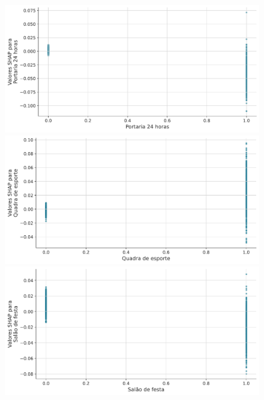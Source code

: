 \documentclass[
  12pt,
  a4paper,
]{scrreprt}
\begin{document}
\begin{figure}
\newline
\begin{minipage}{0.33\linewidth}
\includegraphics{TCC_files/mediabag/includes/dependence_plot_cat/dep_plot_portaria_24_horas.pdf}\end{minipage}%
%
\begin{minipage}{0.33\linewidth}
\includegraphics{TCC_files/mediabag/includes/dependence_plot_cat/dep_plot_quadra_de_esporte.pdf}\end{minipage}%
%
\begin{minipage}{0.33\linewidth}
\includegraphics{TCC_files/mediabag/includes/dependence_plot_cat/dep_plot_salao_de_festa.pdf}\end{minipage}%

\end{figure}
\end{document}
